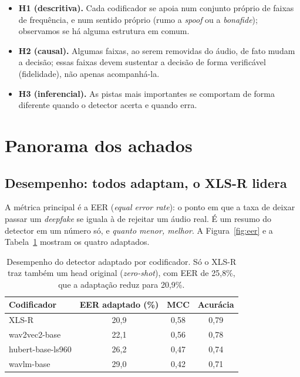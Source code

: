 \documentclass[11pt,a4paper]{article}
\begin{document}
\begin{itemize}[nosep]
  \item \textbf{H1 (descritiva).} Cada codificador se apoia num conjunto próprio de
        faixas de frequência, e num sentido próprio (rumo a \emph{spoof} ou a
        \emph{bonafide}); observamos se há alguma estrutura em comum.
  \item \textbf{H2 (causal).} Algumas faixas, ao serem removidas do áudio, de fato
        mudam a decisão; essas faixas devem sustentar a decisão de forma verificável
        (fidelidade), não apenas acompanhá-la.
  \item \textbf{H3 (inferencial).} As pistas mais importantes se comportam de forma
        diferente quando o detector acerta e quando erra.
\end{itemize}

\section{Panorama dos achados}

\subsection*{Desempenho: todos adaptam, o XLS-R lidera}

A métrica principal é a EER (\emph{equal error rate}): o ponto em que a taxa de
deixar passar um \emph{deepfake} se iguala à de rejeitar um áudio real. É um resumo
do detector em um número só, e \emph{quanto menor, melhor}. A
Figura~\ref{fig:eer} e a Tabela~\ref{tab:perf} mostram os quatro adaptados.

\begin{table}[H]
  \centering
  \small
  \begin{tabular}{lccc}
    \toprule
    Codificador & EER adaptado (\%) & MCC & Acurácia \\
    \midrule
    XLS-R              & 20{,}9 & 0{,}58 & 0{,}79 \\
    wav2vec2-base      & 22{,}1 & 0{,}56 & 0{,}78 \\
    hubert-base-ls960  & 26{,}2 & 0{,}47 & 0{,}74 \\
    wavlm-base         & 29{,}0 & 0{,}42 & 0{,}71 \\
    \bottomrule
  \end{tabular}
  \caption{Desempenho do detector adaptado por codificador. Só o XLS-R traz também
  um head original (\emph{zero-shot}), com EER de 25{,}8\%, que a adaptação reduz
  para 20{,}9\%.}
  \label{tab:perf}
\end{table}
\end{document}
